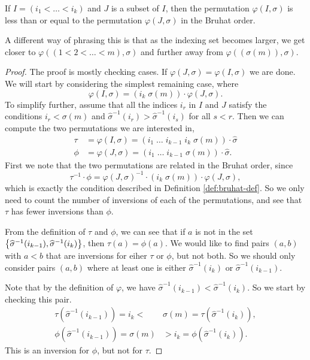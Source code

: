\begin{theorem}
  \label{thm:bruhat-ord}
  If $I = (i_1 < \dots < i_k)$ and $J$ is a subset of $I$, then the
  permutation $\varphi(I,\sigma)$ is less than or equal to the
  permutation $\varphi(J,\sigma)$ in the Bruhat order.
\end{theorem}
A different way of phrasing this is that as the indexing set becomes
larger, we get closer to $\varphi\left((1 < 2 < \dots <
  m),\sigma\right)$ and further away from
$\varphi\left((\sigma(m)),\sigma\right)$.
\begin{proof}
  The proof is mostly checking cases. If $\varphi(J,\sigma) =
  \varphi(I,\sigma)$ we are done. We will start by considering the
  simplest remaining case, where
  \[ \varphi(I,\sigma) = (i_k \; \sigma(m)) \cdot 
  \varphi(J,\sigma). \]
  To simplify further, assume that all the indices $i_r$ in $I$ and
  $J$ satisfy the conditions $i_r < \sigma(m)$ and
  $\widehat{\sigma}^{-1}(i_r) > \widehat{\sigma}^{-1}(i_s)$ for all $s
  < r$. Then we can compute the two permutations we are interested in,
  \begin{align*}
    \tau &= \varphi(I,\sigma) = (i_1\;\dots\;i_{k-1}\;i_k\;\sigma(m))
           \cdot \widehat{\sigma} \\
    \phi &= \varphi(J,\sigma) = (i_1\;\dots\;i_{k-1}\;\sigma(m)) \cdot
    \widehat{\sigma}.
  \end{align*}
  First we note that the two permutations are related in the Bruhat
  order, since
  \[ \tau^{-1} \cdot \phi = \varphi(J,\sigma)^{-1} \cdot
  (i_k\;\sigma(m)) \cdot \varphi(J,\sigma), \]
  which is exactly the condition described in Definition
  \ref{def:bruhat-def}. So
  we only need to count the number of inversions of each of the
  permutations, and
  see that $\tau$ has fewer inversions than $\phi$.

  From the
  definition of $\tau$ and $\phi$, we can see that if $a$ is not in
  the set
  $\left\{ \widehat{\sigma}^{-1}(i_{k-1}),\widehat{\sigma}^{-1}(i_{k}) \right\}$,
  then $\tau(a) = \phi(a)$. We would like to find pairs $(a,b)$
  with $a < b$ that are inversions for eiher $\tau$ or $\phi$, but not
  both. So we should only consider pairs $(a,b)$ where at least one is
  either $\widehat{\sigma}^{-1}(i_k)$ or
  $\widehat{\sigma}^{-1}(i_{k-1})$.

  Note that by the definition of $\varphi$, we have
  $\widehat{\sigma}^{-1}(i_{k-1}) < \widehat{\sigma}^{-1}(i_{k})$. So
  we start by checking this pair.
  \begin{align*}
    \tau(\widehat{\sigma}^{-1}(i_{k-1})) = i_k <\,& \sigma(m) =
    \tau(\widehat{\sigma}^{-1}(i_{k})), \\
    \phi(\widehat{\sigma}^{-1}(i_{k-1})) = \sigma(m) &> i_k =
    \phi(\widehat{\sigma}^{-1}(i_{k})).
  \end{align*}
  This is an inversion for $\phi$, but not for $\tau$. 


\end{proof}
